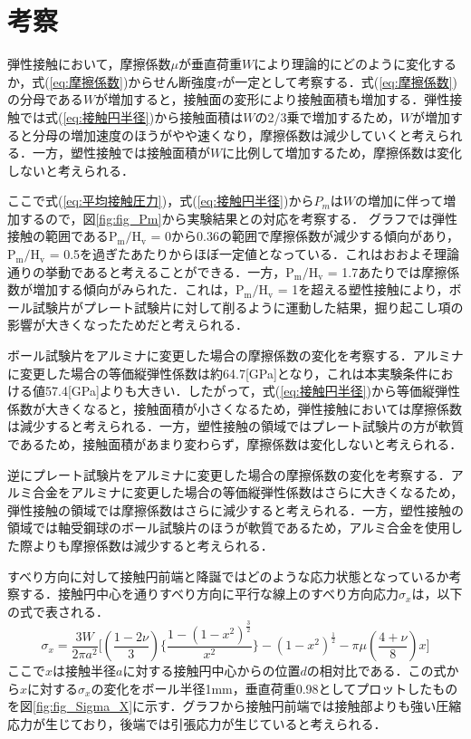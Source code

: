 \section{考察}

弾性接触において，摩擦係数$\mu$が垂直荷重$W$により理論的にどのように変化するか，式(\ref{eq:摩擦係数})からせん断強度$\tau$が一定として考察する．式(\ref{eq:摩擦係数})の分母である$W$が増加すると，接触面の変形により接触面積も増加する．弾性接触では式(\ref{eq:接触円半径})から接触面積は$W$の2/3乗で増加するため，$W$が増加すると分母の増加速度のほうがやや速くなり，摩擦係数は減少していくと考えられる．一方，塑性接触では接触面積が$W$に比例して増加するため，摩擦係数は変化しないと考えられる．

ここで式(\ref{eq:平均接触圧力})，式(\ref{eq:接触円半径})から$P_m$は$W$の増加に伴って増加するので，図\ref{fig:fig_Pm}から実験結果との対応を考察する．
グラフでは弾性接触の範囲である$\mathrm{P_m/H_v}$ = 0から0.36の範囲で摩擦係数が減少する傾向があり，$\mathrm{P_m/H_v}$ = 0.5を過ぎたあたりからほぼ一定値となっている．これはおおよそ理論通りの挙動であると考えることができる．一方，$\mathrm{P_m/H_v}$ = 1.7あたりでは摩擦係数が増加する傾向がみられた．これは，$\mathrm{P_m/H_v}$ = 1を超える塑性接触により，ボール試験片がプレート試験片に対して削るように運動した結果，掘り起こし項の影響が大きくなったためだと考えられる．

ボール試験片をアルミナに変更した場合の摩擦係数の変化を考察する．アルミナに変更した場合の等価縦弾性係数は約64.7[GPa]となり，これは本実験条件における値57.4[GPa]よりも大きい．したがって，式(\ref{eq:接触円半径})から等価縦弾性係数が大きくなると，接触面積が小さくなるため，弾性接触においては摩擦係数は減少すると考えられる．一方，塑性接触の領域ではプレート試験片の方が軟質であるため，接触面積があまり変わらず，摩擦係数は変化しないと考えられる．

逆にプレート試験片をアルミナに変更した場合の摩擦係数の変化を考察する．アルミ合金をアルミナに変更した場合の等価縦弾性係数はさらに大きくなるため，弾性接触の領域では摩擦係数はさらに減少すると考えられる．一方，塑性接触の領域では軸受鋼球のボール試験片のほうが軟質であるため，アルミ合金を使用した際よりも摩擦係数は減少すると考えられる．

すべり方向に対して接触円前端と降誕ではどのような応力状態となっているか考察する．接触円中心を通りすべり方向に平行な線上のすべり方向応力$\sigma_x$は，以下の式で表される．
\begin{equation}
    \label{eq:すべり方向応力}
    \sigma_x = \frac{3W}{2\pi a^2}\lbrack(\frac{1-2\nu}{3})\lbrace\frac{1-(1-x^2)^{\frac{3}{2}}}{x^2}\rbrace - (1 - x^2)^{\frac{1}{2}} - \pi \mu (\frac{4 + \nu}{8})x \rbrack
\end{equation}
ここで$x$は接触半径$a$に対する接触円中心からの位置$d$の相対比である．この式から$x$に対する$\sigma_x$の変化をボール半径1mm，垂直荷重0.98としてプロットしたものを図\ref{fig:fig_Sigma_X}に示す．グラフから接触円前端では接触部よりも強い圧縮応力が生じており，後端では引張応力が生じていると考えられる．

